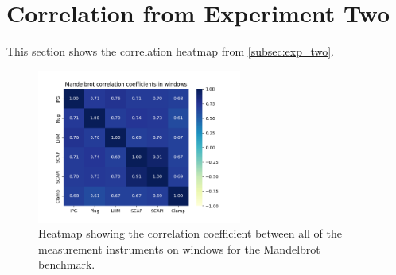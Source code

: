 \section*{Correlation from Experiment Two}\label{app:cor_exp_two}

This section shows the correlation heatmap from \cref{subsec:exp_two}.

\begin{figure}[H]
    \centering
    \hspace*{-1cm} %
    \includegraphics[width=0.6\textwidth]{figures/Mandelbrot_ex2.png}
    \caption{Heatmap showing the correlation coefficient between all of the measurement instruments on windows for the Mandelbrot benchmark.}
    \label{fig:mandelbrotCorr}
\end{figure}